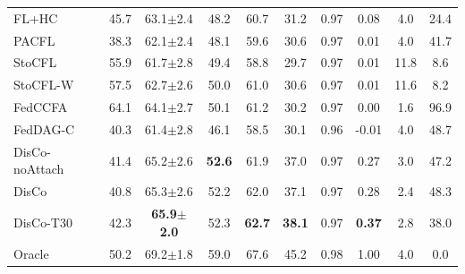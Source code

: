 \begin{tabular}{lccccccccc}
FL+HC & 45.7 & 63.1$\pm$2.4 & 48.2 & 60.7 & 31.2 & 0.97 & 0.08 & 4.0 & 24.4 \\
PACFL & 38.3 & 62.1$\pm$2.4 & 48.1 & 59.6 & 30.6 & 0.97 & 0.01 & 4.0 & 41.7 \\
StoCFL & 55.9 & 61.7$\pm$2.8 & 49.4 & 58.8 & 29.7 & 0.97 & 0.01 & 11.8 & 8.6 \\
StoCFL-W & 57.5 & 62.7$\pm$2.6 & 50.0 & 61.0 & 30.6 & 0.97 & 0.01 & 11.6 & 8.2 \\
FedCCFA & 64.1 & 64.1$\pm$2.7 & 50.1 & 61.2 & 30.2 & 0.97 & 0.00 & 1.6 & 96.9 \\
FedDAG-C & 40.3 & 61.4$\pm$2.8 & 46.1 & 58.5 & 30.1 & 0.96 & -0.01 & 4.0 & 48.7 \\
DisCo-noAttach & 41.4 & 65.2$\pm$2.6 & \textbf{52.6} & 61.9 & 37.0 & 0.97 & 0.27 & 3.0 & 47.2 \\
DisCo & 40.8 & 65.3$\pm$2.6 & 52.2 & 62.0 & 37.1 & 0.97 & 0.28 & 2.4 & 48.3 \\
DisCo-T30 & 42.3 & \textbf{65.9$\pm$2.0} & 52.3 & \textbf{62.7} & \textbf{38.1} & 0.97 & \textbf{0.37} & 2.8 & 38.0 \\
Oracle & 50.2 & 69.2$\pm$1.8 & 59.0 & 67.6 & 45.2 & 0.98 & 1.00 & 4.0 & 0.0 \\
\bottomrule
\end{tabular}
